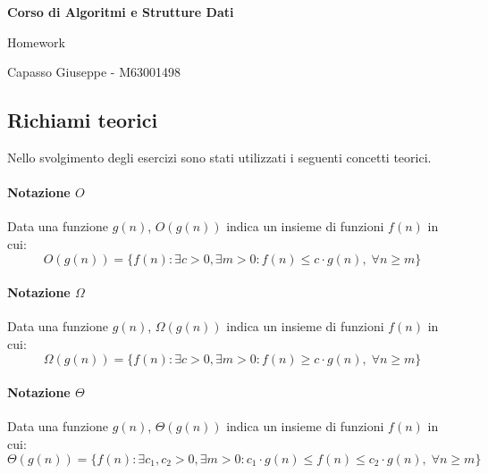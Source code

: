 \documentclass{article}
\begin{document}
\begin{titlepage}
    \begin{center}
        \vspace*{1cm}

        \Huge
        \textbf{Corso di Algoritmi e Strutture Dati}

        \vspace{0.5cm}
        \LARGE
        Homework

        \vfill
        \vspace{0.8cm}

        \Large
        Capasso Giuseppe - M63001498

    \end{center}
\end{titlepage}

\tableofcontents
\newpage

\subsection*{Richiami teorici}
Nello svolgimento degli esercizi sono stati utilizzati i seguenti concetti teorici.

\paragraph{Notazione $O$}
Data una funzione $g(n)$, $O(g(n))$ indica un insieme di funzioni $f(n)$ in cui:
\begin{equation}
    O(g(n)) = \{f(n): \exists c > 0, \exists m > 0: f(n) \leq c\cdot g(n), \; \forall n \geq m\}
\end{equation}

\paragraph{Notazione $\Omega$}
Data una funzione $g(n)$, $\Omega(g(n))$ indica un insieme di funzioni $f(n)$ in cui:
\begin{equation}
    \Omega(g(n)) = \{f(n): \exists c > 0, \exists m > 0: f(n) \geq c\cdot g(n), \; \forall n \geq m\}
\end{equation}

\paragraph*{Notazione $\Theta$}
Data una funzione $g(n)$, $\Theta(g(n))$ indica un insieme di funzioni $f(n)$ in cui:
\begin{equation}
    \Theta(g(n)) = \{f(n): \exists c_1, c_2 > 0, \exists m > 0: c_1\cdot g(n) \leq f(n) \leq c_2\cdot g(n), \; \forall n \geq m\}
    \label{eq:theta}
\end{equation}
\end{document}
